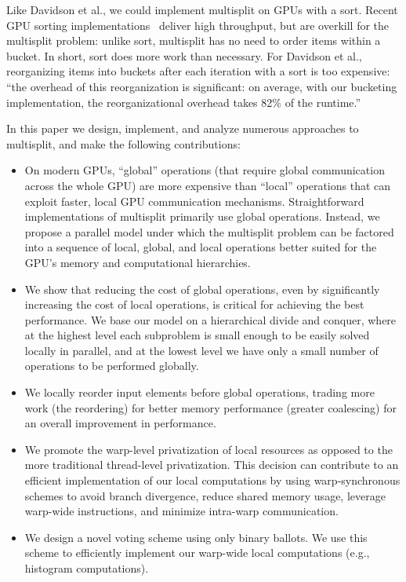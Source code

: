 Like Davidson et al., we could implement multisplit on GPUs with a sort. Recent GPU sorting implementations~\cite{Merrill:2010:RSF} deliver high throughput, but are overkill for the multisplit problem: unlike sort, multisplit has no need to order items within a bucket. In short, sort does more work than necessary. For Davidson et al., reorganizing items into buckets after each iteration with a sort is too expensive: ``the overhead of this reorganization is significant: on average, with our bucketing implementation, the reorganizational overhead takes 82\% of the runtime.''~~\cite[Section~7]{Davidson:2014:WPG:nourl}

In this paper we design, implement, and analyze numerous approaches to multisplit, and make the following contributions:
\begin{itemize}
\item On modern GPUs, ``global'' operations (that require global communication across the whole GPU) are more expensive than ``local'' operations that can exploit faster, local GPU communication mechanisms. Straightforward implementations of multisplit primarily use global operations. Instead, we propose a parallel model under which the multisplit problem can be factored into a sequence of local, global, and local operations better suited for the GPU's memory and computational hierarchies.
\item We show that reducing the cost of global operations, even by significantly increasing the cost of local operations, is critical for achieving the best performance.
  We base our model on a hierarchical divide and conquer, where at the highest level each subproblem is small enough to be easily solved locally in parallel, and at the lowest level we have only a small number of operations to be performed globally.
\item We locally reorder input elements before global operations, trading more work (the reordering) for better memory performance (greater coalescing) for an overall improvement in performance.
\item We promote the warp-level privatization of local resources as opposed to the more traditional thread-level privatization. This decision can contribute to an efficient implementation of our local computations by using warp-synchronous schemes to avoid branch divergence, reduce shared memory usage, leverage warp-wide instructions, and minimize intra-warp communication.
\item We design a novel voting scheme using only binary ballots. We use this scheme to efficiently implement our warp-wide local computations (e.g., histogram computations).

\end{itemize}

